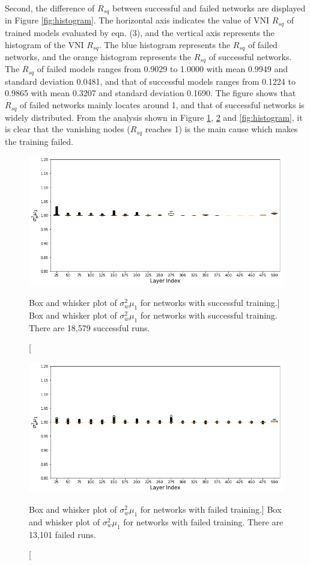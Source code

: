 Second, the difference of $R_{sq}$ between successful and failed networks are displayed in Figure \ref{fig:histogram}.
The horizontal axis indicates the value of VNI $R_{sq}$ of trained models evaluated by eqn. (3), and the vertical axis represents the histogram of the VNI $R_{sq}$.
The blue histogram represents the $R_{sq}$ of failed networks, and the orange histogram represents the $R_{sq}$ of successful networks.
The $R_{sq}$ of failed models ranges from 0.9029 to 1.0000 with mean 0.9949 and standard deviation 0.0481, and that of successful models ranges from 0.1224 to 0.9865 with mean 0.3207 and standard deviation 0.1690.
The figure shows that $R_{sq}$ of failed networks mainly locates around 1, and that of successful networks is widely distributed.
From the analysis shown in Figure \ref{fig:succ_box}, \ref{fig:fail_box} and \ref{fig:histogram}, it is clear that the vanishing nodes ($R_{sq}$ reaches 1) is the main cause which makes the training failed.

\begin{figure}[h]
    \centering
    \includegraphics[width=1.0\textwidth]{img/supp/SuccBox}
    \caption
    [Box and whisker plot of $\sigma_w^2\mu_1$ for networks with successful training.]
    {Box and whisker plot of $\sigma_w^2\mu_1$ for networks with successful training. There are 18,579 successful runs.
    }
    \label{fig:succ_box}
\end{figure}

\begin{figure}[h]
    \centering
    \includegraphics[width=1.0\textwidth]{img/supp/FailBox}
    \caption
    [Box and whisker plot of $\sigma_w^2\mu_1$ for networks with failed training.]
    {Box and whisker plot of $\sigma_w^2\mu_1$ for networks with failed training. There are 13,101 failed runs.
    }
    \label{fig:fail_box}
\end{figure}

